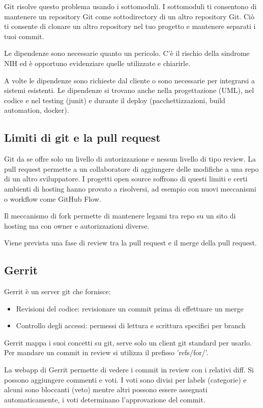 \documentclass[a4paper,12pt,titlepage,oneside]{book}
\begin{document}
Git risolve questo problema usando i sottomoduli. I sottomoduli ti consentono di mantenere un repository Git come sottodirectory di un altro repository Git. Ciò ti consente di clonare un altro repository nel tuo progetto e 
mantenere separati i tuoi commit.

Le dipendenze sono necessarie quanto un pericolo. C'è il rischio della sindrome NIH ed è opportuno evidenziare quelle utilizzate e chiarirle.

A volte le dipendenze sono richieste dal cliente o sono necessarie per integrarsi a sistemi esistenti.
Le dipendenze si trovano anche nella progettazione (UML), nel codice e nel testing (junit) e durante il deploy (pacchettizzazioni, build automation, docker).


\subsection{Limiti di git e la pull request}
Git da se offre solo un livello di autorizzazione e nessun livello di tipo review. La pull request permette a un collaboratore di aggiungere delle modifiche a una repo di un altro sviluppatore.
I progetti open source soffrono di questi limiti e certi ambienti di hosting hanno provato a risolversi, ad esempio con nuovi meccanismi o workflow come GitHub Flow.

Il meccanismo di fork permette di mantenere legami tra repo su un sito di hosting ma con owner e autorizzazioni diverse.

Viene prevista una fase di review tra la pull request e il merge della pull request.

\subsection{Gerrit}
Gerrit è un server git che fornisce:
\begin{itemize}
    \item Revisioni del codice: revisionare un commit prima di effettuare un merge
    \item Controllo degli accessi: permessi di lettura e scrittura specifici per branch
\end{itemize}
Gerrit mappa i suoi concetti su git, serve solo un client git standard per usarlo. Per mandare un commit in review si utilizza il prefisso 'refs/for/'.

La webapp di Gerrit permette di vedere i commit in review con i relativi diff. Si possono aggiungere commenti e voti. I voti sono divisi per labels (categorie) e alcuni sono bloccanti (veto) mentre 
altri possono essere assegnati automaticamente, i voti determinano l'approvazione del commit.
\end{document}
